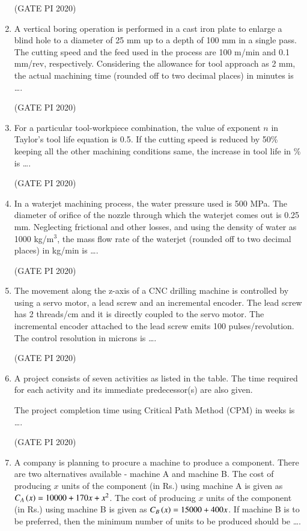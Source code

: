 \documentclass[journal,12pt,onecolumn]{IEEEtran}
\theoremstyle{remark}
\begin{document}
\begin{enumerate}
\hfill (GATE PI 2020)

\item A vertical boring operation is performed in a cast iron plate to enlarge a blind hole to a diameter of 25 mm up to a depth of 100 mm in a single pass. The cutting speed and the feed used in the process are 100 m/min and 0.1 mm/rev, respectively. Considering the allowance for tool approach as 2 mm, the actual machining time (rounded off to two decimal places) in minutes is \dots.

\hfill (GATE PI 2020)

\item For a particular tool\--workpiece combination, the value of exponent $n$ in Taylor's tool life equation is 0.5. If the cutting speed is reduced by 50\% keeping all the other machining conditions same, the increase in tool life in \% is \dots.

\hfill (GATE PI 2020)

\item In a waterjet machining process, the water pressure used is 500 MPa. The diameter of orifice of the nozzle through which the waterjet comes out is 0.25 mm. Neglecting frictional and other losses, and using the density of water as 1000 kg/m$^3$, the mass flow rate of the waterjet (rounded off to two decimal places) in kg/min is \dots.

\hfill (GATE PI 2020)

\item The movement along the z-axis of a CNC drilling machine is controlled by using a servo motor, a lead screw and an incremental encoder. The lead screw has 2 threads/cm and it is directly coupled to the servo motor. The incremental encoder attached to the lead screw emits 100 pulses/revolution. The control resolution in microns is \dots.

\hfill (GATE PI 2020)

\item A project consists of seven activities as listed in the table. The time required for each activity and its immediate predecessor(s) are also given.



The project completion time using Critical Path Method (CPM) in weeks is \dots.

\hfill (GATE PI 2020)
\item A company is planning to procure a machine to produce a component. There are two alternatives available - machine A and machine B. The cost of producing $x$ units of the component (in Rs.) using machine A is given as $C_A\left(x\right) = 10000 + 170x + x^2$. The cost of producing $x$ units of the component (in Rs.) using machine B is given as $C_B\left(x\right) = 15000 + 400x$. If machine B is to be preferred, then the minimum number of units to be produced should be \dots.


\end{enumerate}
\end{document}
